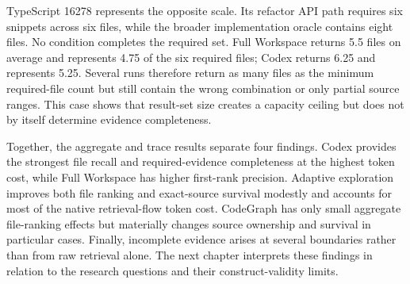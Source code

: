TypeScript 16278 represents the opposite scale. Its refactor API path requires six snippets across six files, while the broader implementation oracle contains eight files. No condition completes the required set. Full Workspace returns 5.5 files on average and represents 4.75 of the six required files; Codex returns 6.25 and represents 5.25. Several runs therefore return as many files as the minimum required-file count but still contain the wrong combination or only partial source ranges. This case shows that result-set size creates a capacity ceiling but does not by itself determine evidence completeness.

Together, the aggregate and trace results separate four findings. Codex provides the strongest file recall and required-evidence completeness at the highest token cost, while Full Workspace has higher first-rank precision. Adaptive exploration improves both file ranking and exact-source survival modestly and accounts for most of the native retrieval-flow token cost. CodeGraph has only small aggregate file-ranking effects but materially changes source ownership and survival in particular cases. Finally, incomplete evidence arises at several boundaries rather than from raw retrieval alone. The next chapter interprets these findings in relation to the research questions and their construct-validity limits.
